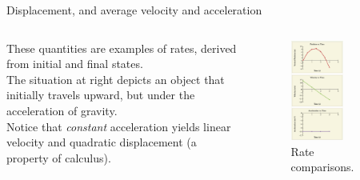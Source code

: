\documentclass{beamer}
\begin{document}
\begin{frame}{Displacement, and average velocity and acceleration}
\begin{columns}[T]
\begin{column}{0.5\textwidth}
\small
These quantities are examples of rates, derived from initial and final states. \\
\vspace{1cm}
The situation at right depicts an object that initially travels upward, but under the acceleration of gravity. \\
\vspace{1 cm}
Notice that \textit{constant} acceleration yields linear velocity and quadratic displacement (a property of calculus).
\end{column}
\begin{column}{0.5\textwidth}
\begin{figure}
\centering
\includegraphics[width=0.6\textwidth]{figures/slope2.png}
\caption{\label{fig:slope2} Rate comparisons.}
\end{figure}
\end{column}
\end{columns}
\end{frame}
\end{document}
